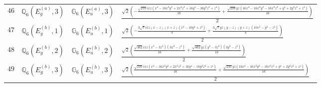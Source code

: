 \documentclass[fleqn,8pt,landscape]{jsarticle}
\begin{document}
\begin{table}[ht!]
\begin{center}
\begin{tabular}{cccl}
$ 46 $ & $ \mathbb{Q}_{6}(E_{g}^{(a)},3) $ & $ \mathbb{G}_{6}(E_{u}^{(a)},3) $ & $ \frac{\sqrt{2} \left(- \frac{\sqrt{210} i x z \left(x^{4} - 16 x^{2} y^{2} + 2 x^{2} z^{2} + 16 y^{4} - 16 y^{2} z^{2} + z^{4}\right)}{16} + \frac{\sqrt{210} y z \left(16 x^{4} - 16 x^{2} y^{2} - 16 x^{2} z^{2} + y^{4} + 2 y^{2} z^{2} + z^{4}\right)}{16}\right)}{2} $ \\
$ 47 $ & $ \mathbb{Q}_{6}(E_{g}^{(b)},1) $ & $ \mathbb{G}_{6}(E_{u}^{(b)},1) $ & $ \frac{\sqrt{2} \left(- \frac{3 \sqrt{7} i x z \left(x - z\right) \left(x + z\right) \left(x^{2} - 10 y^{2} + z^{2}\right)}{4} + \frac{3 \sqrt{7} y z \left(y - z\right) \left(y + z\right) \left(10 x^{2} - y^{2} - z^{2}\right)}{4}\right)}{2} $ \\
$ 48 $ & $ \mathbb{Q}_{6}(E_{g}^{(b)},2) $ & $ \mathbb{G}_{6}(E_{u}^{(b)},2) $ & $ \frac{\sqrt{2} \left(\frac{\sqrt{462} i x z \left(x^{2} - 3 z^{2}\right) \left(3 x^{2} - z^{2}\right)}{16} + \frac{\sqrt{462} y z \left(y^{2} - 3 z^{2}\right) \left(3 y^{2} - z^{2}\right)}{16}\right)}{2} $ \\
$ 49 $ & $ \mathbb{Q}_{6}(E_{g}^{(b)},3) $ & $ \mathbb{G}_{6}(E_{u}^{(b)},3) $ & $ \frac{\sqrt{2} \left(\frac{\sqrt{210} i x z \left(x^{4} - 16 x^{2} y^{2} + 2 x^{2} z^{2} + 16 y^{4} - 16 y^{2} z^{2} + z^{4}\right)}{16} + \frac{\sqrt{210} y z \left(16 x^{4} - 16 x^{2} y^{2} - 16 x^{2} z^{2} + y^{4} + 2 y^{2} z^{2} + z^{4}\right)}{16}\right)}{2} $ \\
 \hline \hline
\end{tabular}
\end{center}
\end{table}
\end{document}

